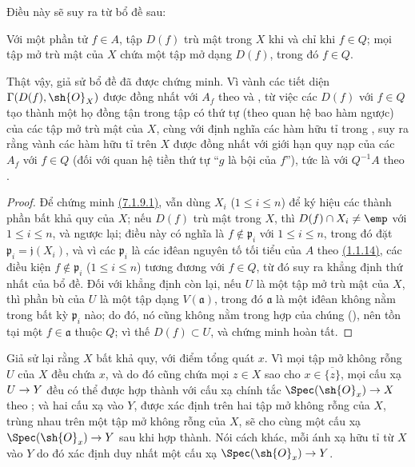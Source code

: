 \documentclass[oneside]{amsart}
\makeatletter
\renewcommand{\leq}{\leqslant}
\newcommand{\ega@arrow}[2]{\mathchoice{#1}{#2}{#2}{#2}}
\renewcommand{\to}{\ega@arrow{\longrightarrow}{\rightarrow}}
\let\EGAOriginalLabel\label
\renewcommand{\label}[1]{\phantomsection\EGAOriginalLabel{#1}}
\makeatother
\begin{document}
Điều này sẽ suy ra từ bổ đề sau:

\begin{lemma}[7.1.9.1]
\label{I.7.1.9.1}
Với một phần tử $f\in A$, tập $D(f)$ trù mật trong $X$ khi và chỉ khi $f\in Q$; mọi tập mở trù mật của $X$ chứa một tập mở dạng $D(f)$, trong đó $f\in Q$.
\end{lemma}

Thật vậy, giả sử bổ đề đã được chứng minh. Vì vành các tiết diện $\Gamma(D(f),\sh{O}_X)$ được đồng nhất với $A_f$ theo  và , từ việc các $D(f)$ với $f\in Q$ tạo thành một họ đồng tận trong tập có thứ tự (theo quan hệ bao hàm ngược) của các tập mở trù mật của $X$, cùng với định nghĩa các hàm hữu tỉ trong , suy ra rằng vành các hàm hữu tỉ trên $X$ được đồng nhất với giới hạn quy nạp của các $A_f$ với $f\in Q$ (đối với quan hệ tiền thứ tự ``$g$ là bội của $f$''), tức là với $Q^{-1}A$ theo .

\begin{proof}
Để chứng minh \hyperref[I.7.1.9.1]{(7.1.9.1)}, vẫn dùng $X_i$ ($1\leq i\leq n$) để ký hiệu các thành phần bất khả quy của $X$; nếu $D(f)$ trù mật trong $X$, thì $D(f)\cap X_i\neq\emp$ với $1\leq i\leq n$, và ngược lại; điều này có nghĩa là $f\not\in\mathfrak{p}_i$ với $1\leq i\leq n$, trong đó đặt $\mathfrak{p}_i=\mathfrak{j}(X_i)$, và vì các $\mathfrak{p}_i$ là các iđêan nguyên tố tối tiểu của $A$ theo \hyperref[I.1.1.14]{(1.1.14)}, các điều kiện $f\not\in\mathfrak{p}_i$ ($1\leq i\leq n$) tương đương với $f\in Q$, từ đó suy ra khẳng định thứ nhất của bổ đề.
Đối với khẳng định còn lại, nếu $U$ là một tập mở trù mật của $X$, thì phần bù của $U$ là một tập dạng $V(\mathfrak{a})$, trong đó $\mathfrak{a}$ là một iđêan không nằm trong bất kỳ $\mathfrak{p}_i$ nào; do đó, nó cũng không nằm trong hợp của chúng (\cite[p.~13]{I-10}), nên tồn tại một $f\in\mathfrak{a}$ thuộc $Q$; vì thế $D(f)\subset U$, và chứng minh hoàn tất.
\end{proof}

\begin{env}[7.1.10]
\label{I.7.1.10}
Giả sử lại rằng $X$ bất khả quy, với điểm tổng quát $x$.
Vì mọi tập mở không rỗng $U$ của $X$ đều chứa $x$, và do đó cũng chứa mọi $z\in X$ sao cho $x\in\overline{\{z\}}$, mọi cấu xạ $U\to Y$ đều có thể được hợp thành với cấu xạ chính tắc $\Spec(\sh{O}_x)\to X$ theo ; và hai cấu xạ vào $Y$, được xác định trên hai tập mở không rỗng của $X$, trùng nhau trên một tập mở không rỗng của $X$, sẽ cho cùng một cấu xạ $\Spec(\sh{O}_x)\to Y$ sau khi hợp thành.
Nói cách khác, mỗi ánh xạ hữu tỉ từ $X$ vào $Y$ do đó xác định duy nhất một cấu xạ $\Spec(\sh{O}_x)\to Y$.
\end{env}
\end{document}
